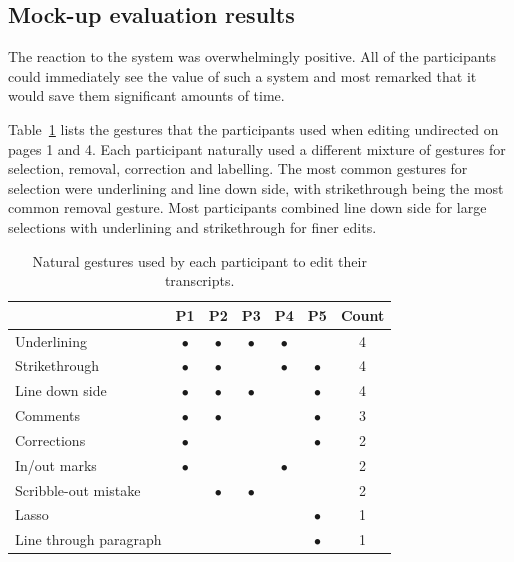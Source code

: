 
\subsection{Mock-up evaluation results}

The reaction to the system was overwhelmingly positive. All of the participants could immediately see the value of such
a system and most remarked that it would save them significant amounts of time.

Table~\ref{tab:natural-gestures} lists the gestures that the participants used when editing undirected on pages 1 and
4.  Each participant naturally used a different mixture of gestures for selection, removal, correction and labelling.
The most common gestures for selection were underlining and line down side, with strikethrough being the most common
removal gesture.  Most participants combined line down side for large selections with underlining and strikethrough for
finer edits.

\begin{table}[h]
  \centering
  \begin{tabular}{l c c c c c c}
    \hline
    & \textbf{P1} & \textbf{P2} & \textbf{P3} & \textbf{P4} & \textbf{P5} & \textbf{Count} \\
    \hline
    Underlining               & $\bullet$ & $\bullet$ & $\bullet$ & $\bullet$ &           & 4 \\
    Strikethrough           & $\bullet$ & $\bullet$ &           & $\bullet$ & $\bullet$ & 4 \\
    Line down side          & $\bullet$ & $\bullet$ & $\bullet$ &           & $\bullet$ & 4 \\
    Comments                & $\bullet$ & $\bullet$ &           &           & $\bullet$ & 3 \\
    Corrections             & $\bullet$ &           &           &           & $\bullet$ & 2 \\
    In/out marks            & $\bullet$ &           &           & $\bullet$ &           & 2 \\
    Scribble-out mistake    &           & $\bullet$ & $\bullet$ &           &           & 2 \\
    Lasso                   &           &           &           &           & $\bullet$ & 1 \\
    Line through paragraph  &           &           &           &           & $\bullet$ & 1 \\
    \hline
  \end{tabular}
  \caption{Natural gestures used by each participant to edit their transcripts.}
  \label{tab:natural-gestures}
\end{table}

